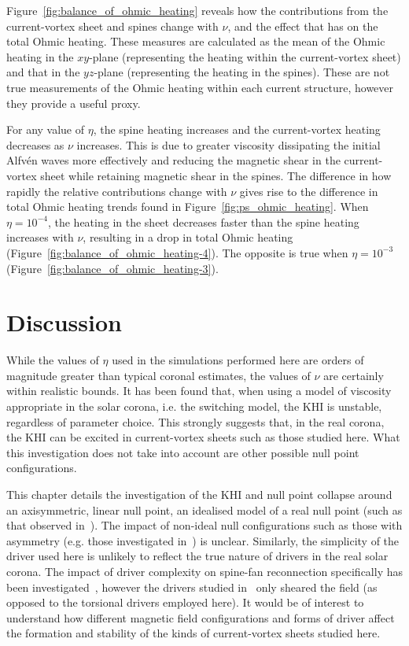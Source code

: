 Figure~\ref{fig:balance_of_ohmic_heating} reveals how the contributions from the current-vortex sheet and spines change with $\nu$, and the effect that has on the total Ohmic heating. These measures are calculated as the mean of the Ohmic heating in the $xy$-plane (representing the heating within the current-vortex sheet) and that in the $yz$-plane (representing the heating in the spines). These are not true measurements of the Ohmic heating within each current structure, however they provide a useful proxy. 

For any value of $\eta$, the spine heating increases and the current-vortex heating decreases as $\nu$ increases. This is due to greater viscosity dissipating the initial Alfv\'en waves more effectively and reducing the magnetic shear in the current-vortex sheet while retaining magnetic shear in the spines. The difference in how rapidly the relative contributions change with $\nu$ gives rise to the difference in total Ohmic heating trends found in Figure~\ref{fig:ps_ohmic_heating}. When $\eta=10^{-4}$, the heating in the sheet decreases faster than the spine heating increases with $\nu$, resulting in a drop in total Ohmic heating (Figure~\ref{fig:balance_of_ohmic_heating-4}). The opposite is true when $\eta=10^{-3}$ (Figure~\ref{fig:balance_of_ohmic_heating-3}).

\section{Discussion}
\label{sec:khi_discussion}

While the values of $\eta$ used in the simulations performed here are orders of magnitude greater than typical coronal estimates, the values of $\nu$ are certainly within realistic bounds. It has been found that, when using a model of viscosity appropriate in the solar corona, i.e. the switching model, the KHI is unstable, regardless of parameter choice. This strongly suggests that, in the real corona, the KHI can be excited in current-vortex sheets such as those studied here. What this investigation does not take into account are other possible null point configurations.

This chapter details the investigation of the KHI and null point collapse around an axisymmetric, linear null point, an idealised model of a real null point (such as that observed in~\cite{massonNATUREFLARERIBBONS2009}). The impact of non-ideal null configurations such as those with asymmetry (e.g. those investigated in~\cite{thurgoodImplosiveCollapseMagnetic2018,pontinWhyAreFlare2016a}) is unclear. Similarly, the simplicity of the driver used here is unlikely to reflect the true nature of drivers in the real solar corona. The impact of driver complexity on spine-fan reconnection specifically has been investigated~\cite{wyperSpinefanReconnectionInfluence2012}, however the drivers studied in~\cite{wyperSpinefanReconnectionInfluence2012} only sheared the field (as opposed to the torsional drivers employed here). It would be of interest to understand how different magnetic field configurations and forms of driver affect the formation and stability of the kinds of current-vortex sheets studied here.

